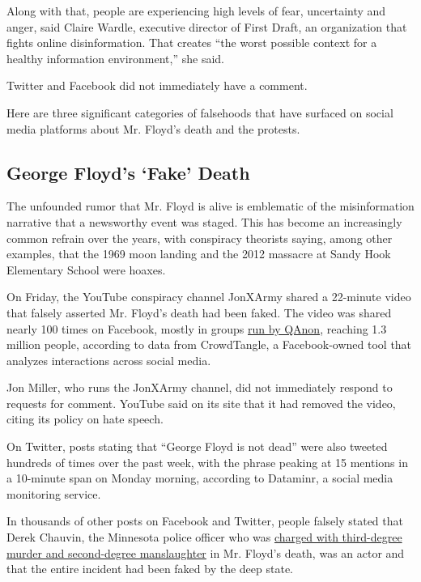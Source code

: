 Along with that, people are experiencing high levels of fear,
uncertainty and anger, said Claire Wardle, executive director of First
Draft, an organization that fights online disinformation. That creates
``the worst possible context for a healthy information environment,''
she said.

Twitter and Facebook did not immediately have a comment.

Here are three significant categories of falsehoods that have surfaced
on social media platforms about Mr. Floyd's death and the protests.

\hypertarget{george-floyds-fake-death}{%
\subsection{George Floyd's `Fake'
Death}\label{george-floyds-fake-death}}

The unfounded rumor that Mr. Floyd is alive is emblematic of the
misinformation narrative that a newsworthy event was staged. This has
become an increasingly common refrain over the years, with conspiracy
theorists saying, among other examples, that the 1969 moon landing and
the 2012 massacre at Sandy Hook Elementary School were hoaxes.

On Friday, the YouTube conspiracy channel JonXArmy shared a 22-minute
video that falsely asserted Mr. Floyd's death had been faked. The video
was shared nearly 100 times on Facebook, mostly in groups
\href{https://www.nytimes.com/2020/02/09/us/politics/qanon-trump-conspiracy-theory.html}{run
by QAnon}, reaching 1.3 million people, according to data from
CrowdTangle, a Facebook-owned tool that analyzes interactions across
social media.

Jon Miller, who runs the JonXArmy channel, did not immediately respond
to requests for comment. YouTube said on its site that it had removed
the video, citing its policy on hate speech.

On Twitter, posts stating that ``George Floyd is not dead'' were also
tweeted hundreds of times over the past week, with the phrase peaking at
15 mentions in a 10-minute span on Monday morning, according to
Dataminr, a social media monitoring service.

In thousands of other posts on Facebook and Twitter, people falsely
stated that Derek Chauvin, the Minnesota police officer who was
\href{https://www.nytimes.com/2020/05/29/us/minneapolis-police-george-floyd.html}{charged
with third-degree murder and second-degree manslaughter} in Mr. Floyd's
death, was an actor and that the entire incident had been faked by the
deep state.


